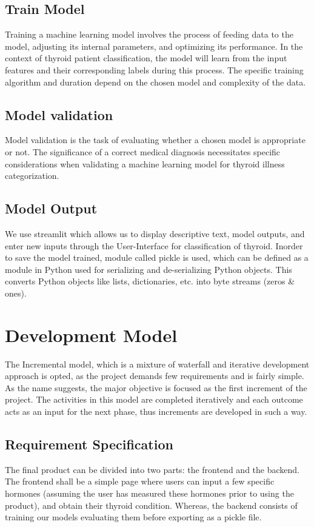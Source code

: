 \subsection{Train Model}
Training a machine learning model involves the process of feeding data to the model, adjusting its internal parameters, and optimizing its performance. In the context of thyroid patient classification, the model will learn from the input features and their corresponding labels during this process. The specific training algorithm and duration depend on the chosen model and complexity of the data.
\subsection{Model validation}
Model validation is the task of evaluating whether a chosen model is appropriate or not. The significance of a correct medical diagnosis necessitates specific considerations when validating a machine learning model for thyroid illness categorization.
\subsection{Model Output}
We use streamlit which allows us to display descriptive text, model outputs, and enter new inputs through the User-Interface for classification of thyroid. Inorder to save the model trained, module called pickle is used, which can be defined as a module in Python used for serializing and de-serializing Python objects. This converts Python objects like lists, dictionaries, etc. into byte streams (zeros \& ones).
\section{Development Model}
The Incremental model, which is a mixture of waterfall and iterative development approach is opted, as the project demands few requirements and is fairly simple. As the name suggests, the major objective is focused as the first increment of the project. The activities in this model are completed iteratively and each outcome acts as an input for the next phase, thus increments are developed in such a way.
\subsection{Requirement Specification}
The final product can be divided into two parts: the frontend and the backend. The frontend shall be a simple page where users can input a few specific hormones (assuming the user has measured these hormones prior to using the product), and obtain their thyroid condition. Whereas, the backend consists of training our models evaluating them before exporting as a pickle file.
